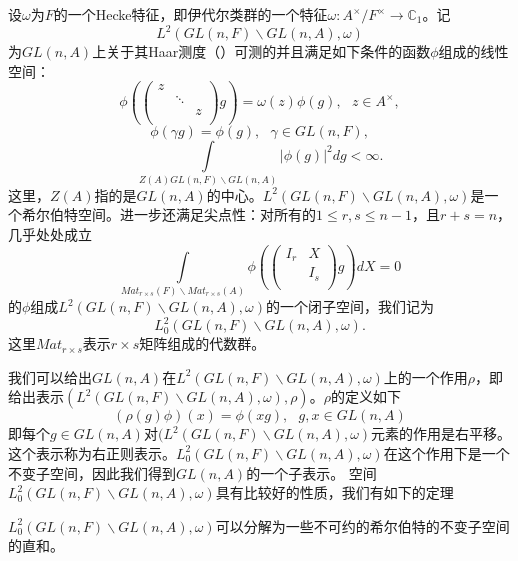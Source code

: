   设$\omega$为$F$的一个Hecke特征，即伊代尔类群的一个特征$\omega:A^{\times}/F^{\times}\rightarrow \mathbb{C}_1$。记
  $$L^2(GL(n,F)\backslash GL(n,A), \omega)$$
  为$GL(n,A)$上关于其Haar测度（）可测的并且满足如下条件的函数$\phi$组成的线性空间：
  \begin{equation}
  \label{eq1}
  \phi\left(\left(
  \begin{array}{lll}
  z & & \\
  & \ddots & \\
  & & z \\
  \end{array}\right)
  g \right)
  = \omega(z)\phi(g),\ \ \ z\in A^{\times},
  \end{equation}
  \begin{equation}
  \label{eq2}
  \phi(\gamma g) = \phi(g),\ \ \ \gamma\in GL(n,F),
  \end{equation}
  $$\int\limits_{Z(A)GL(n,F)\backslash GL(n,A)} |\phi(g)|^2dg <
  \infty.$$
  这里，$Z(A)$指的是$GL(n,A)$的中心。$L^2(GL(n,F)\backslash GL(n,A),
  \omega)$是一个希尔伯特空间。进一步还满足尖点性：对所有的$1\leqslant
  r,s\leqslant n-1$，且$r+s=n$，几乎处处成立
  \begin{equation}
  \label{eq3}
  \int\limits_{Mat_{r\times s}(F)\backslash Mat_{r\times s}(A)}
  \phi\left(\left(
  \begin{array}{ll}
  I_r & X \\
  & I_s \\
  \end{array}\right)
  g \right)
  dX = 0
  \end{equation}
  的$\phi$组成$L^2(GL(n,F)\backslash GL(n,A), \omega)$的一个闭子空间，我们记为
  $$L^2_0(GL(n,F)\backslash GL(n,A), \omega).$$
  这里$Mat_{r\times s}$表示$r\times s$矩阵组成的代数群。

  我们可以给出$GL(n,A)$在$L^2(GL(n,F)\backslash GL(n,A),
  \omega)$上的一个作用$\rho$，即给出表示$(L^2(GL(n,F)\backslash GL(n,A),
  \omega),\rho)$。$\rho$的定义如下
  $$(\rho(g)\phi)(x) = \phi(xg),\ \ \ g,x\in GL(n,A)$$
  即每个$g\in GL(n,A)$对$(L^2(GL(n,F)\backslash GL(n,A),
  \omega)$元素的作用是右平移。这个表示称为右正则表示。$L^2_0(GL(n,F)\backslash GL(n,A),
  \omega)$在这个作用下是一个不变子空间，因此我们得到$GL(n,A)$的一个子表示。
  空间$L^2_0(GL(n,F)\backslash GL(n,A),
  \omega)$具有比较好的性质，我们有如下的定理

  \begin{theorem}
  \label{thm3}
  $L_0^2(GL(n,F)\backslash
  GL(n,A),\omega)$可以分解为一些不可约的希尔伯特的不变子空间的直和。
  \end{theorem}

